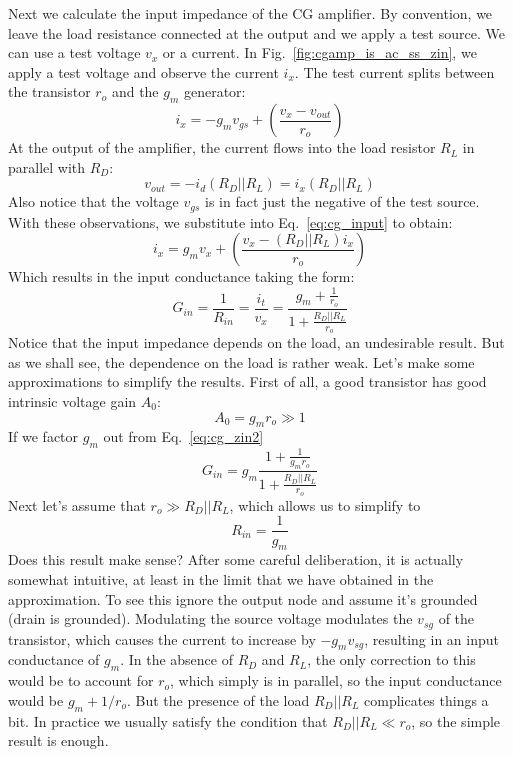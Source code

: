 Next we calculate the input impedance of the CG amplifier.  By convention, we leave the load resistance connected at the output and we apply a test source.  We can use a test voltage $v_x$ or a current.  In Fig.~\ref{fig:cgamp_is_ac_ss_zin}, we apply a test voltage and observe the current $i_x$.  The test current splits between the transistor $r_o$ and the $g_m$ generator:
\begin{equation}
	{i_x} =  - {g_m}{v_{gs}} + \left( {\frac{{{v_x} - {v_{out}}}}{{{r_o}}}} \right) \label{eq:cg_input}
\end{equation}
At the output of the amplifier, the current flows into the load resistor $R_L$ in parallel with $R_D$:
\begin{equation}
	{v_{out}} =  - {i_d}({R_D}||{R_L}) = {i_x}({R_D}||{R_L})
\end{equation}
Also notice that the voltage $v_{gs}$ is in fact just the negative of the test source.  With these observations, we substitute into Eq.~\ref{eq:cg_input} to obtain:
\begin{equation}
	{i_x} = {g_m}{v_x} + \left( {\frac{{{v_x} - \left( {{R_D}||{R_L}} \right){i_x}}}{{{r_o}}}} \right)
\end{equation}
Which results in the input conductance taking the form:
\begin{equation}
	G_{in} = \frac{1}{{{R_{in}}}} = \frac{{{i_t}}}{{{v_x}}} = \frac{{{g_m} + \frac{1}{{{r_o}}}}}{{1 + \frac{{{R_D}||{R_L}}}{{{r_o}}}}} \label{eq:cg_zin2}
\end{equation}
Notice that the input impedance depends on the load, an undesirable result.  But as we shall see, the dependence on the load is rather weak.  Let's make some approximations to simplify the results.  First of all, a good transistor has good intrinsic voltage gain $A_0$: 
\begin{equation}
	A_0 = g_m r_o \gg 1
\end{equation}
If we factor $g_m$ out from Eq.~\ref{eq:cg_zin2}
\begin{equation}
	G_{in} = g_m \frac{{1 + \frac{1}{{{g_m r_o}}}}}{{1 + \frac{{{R_D}||{R_L}}}{{{r_o}}}}}
\end{equation}
Next let's assume that $r_o \gg R_D||R_L$, which allows us to simplify to
\begin{equation}
	{R_{in}} = \frac{1}{{{g_m}}}
\end{equation}
Does this result make sense?  After some careful deliberation, it is actually somewhat intuitive, at least in the limit that we have obtained in the approximation.  To see this ignore the output node and assume it's grounded (drain is grounded). Modulating the source voltage modulates the $v_{sg}$ of the transistor, which causes the current to increase by $-g_m v_{sg}$, resulting in an input conductance of $g_m$.  In the absence of $R_D$ and $R_L$, the only correction to this would be to account for $r_o$, which simply is in parallel, so the input conductance would be $g_m + 1/r_o$.  But the presence of the load $R_D || R_L$ complicates things a bit.  In practice we usually satisfy the condition that $R_D || R_L \ll r_o$, so the simple result is enough. 
